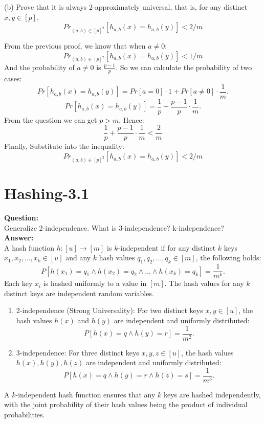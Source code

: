 \documentclass[12pt]{article}
\begin{document}
(b) Prove that it is always 2-approximately universal, that is, for any distinct \(x, y \in [p]\), 
\[Pr_{(a,b)\in[p]^2}[h_{a,b}(x) = h_{a,b}(y)] < 2/m\]

From the previous proof, we know that when \(a \neq 0\):
\[Pr_{(a,b)\in[p]^2}[h_{a,b}(x) = h_{a,b}(y)] < 1/m\]
And the probability of \(a \neq 0\) is \(\frac{p-1}{p}\).
So we can calculate the probability of two cases:
\[
Pr[h_{a,b}(x) = h_{a,b}(y)] = Pr[a = 0] \cdot 1 + Pr[a \neq 0] \cdot \frac{1}{m}.
\]
\[
Pr[h_{a,b}(x) = h_{a,b}(y)] = \frac{1}{p} + \frac{p-1}{p} \cdot \frac{1}{m}.
\]
From the question we can get \(p>m\), Hence:
\[\frac{1}{p} + \frac{p-1}{p} \cdot \frac{1}{m}<\frac{2}{m}\]
Finally, Substitute into the inequality:
\[Pr_{(a,b)\in[p]^2}[h_{a,b}(x) = h_{a,b}(y)] < 2/m\]




\section{Hashing-3.1}
\textbf{Question:}\\
Generalize 2-independence. What is 3-independence? k-independence?\\
\textbf{Answer:}\\
A hash function \( h : [u] \to [m] \) is \( k \)-independent if for any distinct \( k \) keys \( x_1, x_2, \dots, x_k \in [u] \) and any \( k \) hash values \( q_1, q_2, \dots, q_k \in [m] \), the following holds:
\[
P[h(x_1) = q_1 \land h(x_2) = q_2 \land \dots \land h(x_k) = q_k] = \frac{1}{m^k}.
\]
Each key \( x_i \) is hashed uniformly to a value in \( [m] \). The hash values for any \( k \) distinct keys are independent random variables.
\begin{enumerate}
    \item 2-independence (Strong Universality): For two distinct keys \( x, y \in [u] \), the hash values \( h(x) \) and \( h(y) \) are independent and uniformly distributed:
    \[
    P[h(x) = q \land h(y) = r] = \frac{1}{m^2}.
    \]
    \item 3-independence: For three distinct keys \( x, y, z \in [u] \), the hash values \( h(x), h(y), h(z) \) are independent and uniformly distributed:
    \[
    P[h(x) = q \land h(y) = r \land h(z) = s] = \frac{1}{m^3}.
    \]
\end{enumerate}
A \( k \)-independent hash function ensures that any \( k \) keys are hashed independently, with the joint probability of their hash values being the product of individual probabilities.
\end{document}
